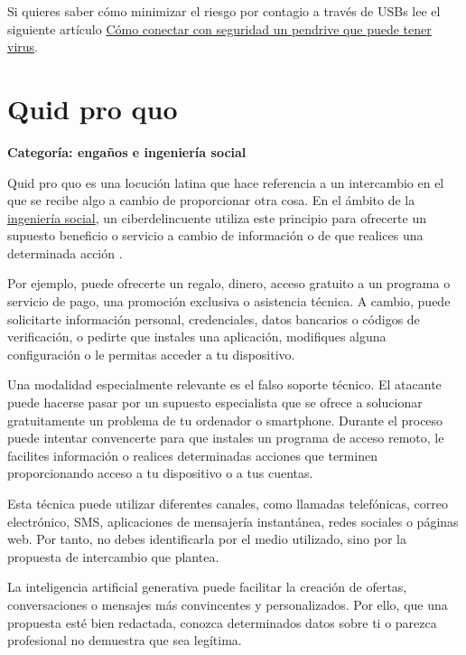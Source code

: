 \documentclass[
  spanish,
  a4paper,
  openany]{book}
\begin{document}
Si quieres saber cómo minimizar el riesgo por contagio a través de USBs lee el siguiente artículo \href{https://www.redeszone.net/tutoriales/seguridad/que-hacer-pendrive-virus/}{Cómo conectar con seguridad un pendrive que puede tener virus}.

\section{Quid pro quo}\label{quid-pro-quo}

\textbf{Categoría: engaños e ingeniería social}

Quid pro quo es una locución latina que hace referencia a un intercambio en el que se recibe algo a cambio de proporcionar otra cosa. En el ámbito de la \href{https://es.wikipedia.org/wiki/Ingeniería_social_(seguridad_informática)}{ingeniería social}, un ciberdelincuente utiliza este principio para ofrecerte un supuesto beneficio o servicio a cambio de información o de que realices una determinada acción \citep{quid-pro-quo}.

Por ejemplo, puede ofrecerte un regalo, dinero, acceso gratuito a un programa o servicio de pago, una promoción exclusiva o asistencia técnica. A cambio, puede solicitarte información personal, credenciales, datos bancarios o códigos de verificación, o pedirte que instales una aplicación, modifiques alguna configuración o le permitas acceder a tu dispositivo.

Una modalidad especialmente relevante es el falso soporte técnico. El atacante puede hacerse pasar por un supuesto especialista que se ofrece a solucionar gratuitamente un problema de tu ordenador o smartphone. Durante el proceso puede intentar convencerte para que instales un programa de acceso remoto, le facilites información o realices determinadas acciones que terminen proporcionando acceso a tu dispositivo o a tus cuentas.

Esta técnica puede utilizar diferentes canales, como llamadas telefónicas, correo electrónico, SMS, aplicaciones de mensajería instantánea, redes sociales o páginas web. Por tanto, no debes identificarla por el medio utilizado, sino por la propuesta de intercambio que plantea.

La inteligencia artificial generativa puede facilitar la creación de ofertas, conversaciones o mensajes más convincentes y personalizados. Por ello, que una propuesta esté bien redactada, conozca determinados datos sobre ti o parezca profesional no demuestra que sea legítima.
\end{document}
